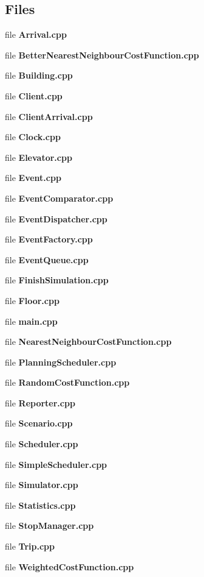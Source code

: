\subsection*{Files}
\begin{DoxyCompactItemize}
\item 
file {\bf Arrival.\+cpp}
\item 
file {\bf Better\+Nearest\+Neighbour\+Cost\+Function.\+cpp}
\item 
file {\bf Building.\+cpp}
\item 
file {\bf Client.\+cpp}
\item 
file {\bf Client\+Arrival.\+cpp}
\item 
file {\bf Clock.\+cpp}
\item 
file {\bf Elevator.\+cpp}
\item 
file {\bf Event.\+cpp}
\item 
file {\bf Event\+Comparator.\+cpp}
\item 
file {\bf Event\+Dispatcher.\+cpp}
\item 
file {\bf Event\+Factory.\+cpp}
\item 
file {\bf Event\+Queue.\+cpp}
\item 
file {\bf Finish\+Simulation.\+cpp}
\item 
file {\bf Floor.\+cpp}
\item 
file {\bf main.\+cpp}
\item 
file {\bf Nearest\+Neighbour\+Cost\+Function.\+cpp}
\item 
file {\bf Planning\+Scheduler.\+cpp}
\item 
file {\bf Random\+Cost\+Function.\+cpp}
\item 
file {\bf Reporter.\+cpp}
\item 
file {\bf Scenario.\+cpp}
\item 
file {\bf Scheduler.\+cpp}
\item 
file {\bf Simple\+Scheduler.\+cpp}
\item 
file {\bf Simulator.\+cpp}
\item 
file {\bf Statistics.\+cpp}
\item 
file {\bf Stop\+Manager.\+cpp}
\item 
file {\bf Trip.\+cpp}
\item 
file {\bf Weighted\+Cost\+Function.\+cpp}
\end{DoxyCompactItemize}
